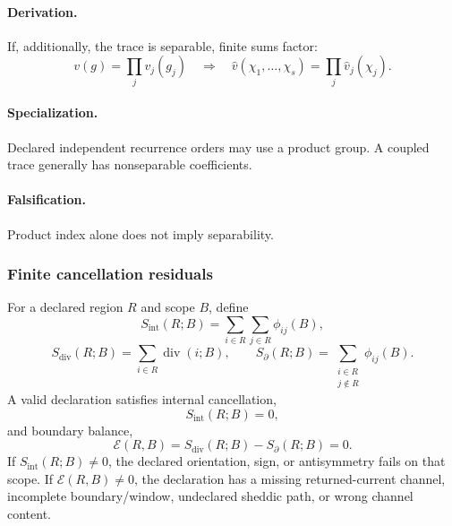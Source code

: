 \paragraph{Derivation.}
If, additionally, the trace is separable, finite sums factor:
\begin{equation}
v(g)=\prod_j v_j(g_j)
\quad\Longrightarrow\quad
\widehat v(\chi_1,\ldots,\chi_s)=\prod_j\widehat v_j(\chi_j).
\label{eq:fourier-product-factorization}
\end{equation}
\paragraph{Specialization.} Declared independent recurrence orders may use
a product group. A coupled trace generally has nonseparable coefficients.
\paragraph{Falsification.} Product index alone does not imply separability.

\subsubsection{Finite cancellation residuals}
\label{subsec:afc-flux-stokes-audit}
For a declared region \(R\) and scope \(B\), define
\begin{equation}
S_{\mathrm{int}}(R;B)
=
\sum_{i\in R}\sum_{j\in R}\phi_{ij}(B),
\label{eq:stokes-audit-internal}
\end{equation}
\begin{equation}
S_{\mathrm{div}}(R;B)
=
\sum_{i\in R}\operatorname{div}(i;B),
\qquad
S_{\partial}(R;B)
=
\sum_{\substack{i\in R\\j\notin R}}\phi_{ij}(B).
\label{eq:stokes-audit-sums}
\end{equation}
A valid declaration satisfies internal cancellation,
\begin{equation}
S_{\mathrm{int}}(R;B)=0,
\label{eq:stokes-audit-internal-zero}
\end{equation}
and boundary balance,
\begin{equation}
\mathcal E(R,B)
=
S_{\mathrm{div}}(R;B)-S_{\partial}(R;B)=0.
\label{eq:stokes-audit-residual}
\end{equation}
If \(S_{\mathrm{int}}(R;B)\ne0\), the declared orientation, sign, or antisymmetry fails on that scope. If \(\mathcal E(R,B)\ne0\), the declaration has a missing returned-current channel, incomplete boundary/window, undeclared sheddic path, or wrong channel content.

